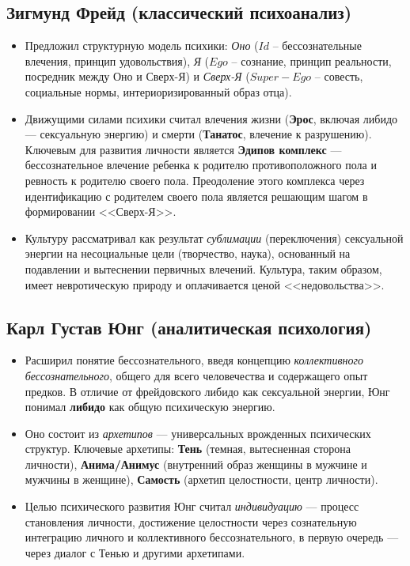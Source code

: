 \documentclass[12pt,a4paper]{article}
\begin{document}
	\subsection{Зигмунд Фрейд (классический психоанализ)}
	\begin{itemize}
		\item Предложил структурную модель психики: \textit{Оно} ($Id$ -- бессознательные влечения, принцип удовольствия), \textit{Я} ($Ego$ -- сознание, принцип реальности, посредник между Оно и Сверх-Я) и \textit{Сверх-Я} ($Super-Ego$ -- совесть, социальные нормы, интериоризированный образ отца).
		\item Движущими силами психики считал влечения жизни (\textbf{Эрос}, включая либидо — сексуальную энергию) и смерти (\textbf{Танатос}, влечение к разрушению). Ключевым для развития личности является \textbf{Эдипов комплекс} — бессознательное влечение ребенка к родителю противоположного пола и ревность к родителю своего пола. Преодоление этого комплекса через идентификацию с родителем своего пола является решающим шагом в формировании <<Сверх-Я>>.
		\item Культуру рассматривал как результат \textit{сублимации} (переключения) сексуальной энергии на несоциальные цели (творчество, наука), основанный на подавлении и вытеснении первичных влечений. Культура, таким образом, имеет невротическую природу и оплачивается ценой <<недовольства>>.
	\end{itemize}
	
	\subsection{Карл Густав Юнг (аналитическая психология)}
	\begin{itemize}
		\item Расширил понятие бессознательного, введя концепцию \textit{коллективного бессознательного}, общего для всего человечества и содержащего опыт предков. В отличие от фрейдовского либидо как сексуальной энергии, Юнг понимал \textbf{либидо} как общую психическую энергию.
		\item Оно состоит из \textit{архетипов} — универсальных врожденных психических структур. Ключевые архетипы: \textbf{Тень} (темная, вытесненная сторона личности), \textbf{Анима/Анимус} (внутренний образ женщины в мужчине и мужчины в женщине), \textbf{Самость} (архетип целостности, центр личности).
		\item Целью психического развития Юнг считал \textit{индивидуацию} — процесс становления личности, достижение целостности через сознательную интеграцию личного и коллективного бессознательного, в первую очередь — через диалог с Тенью и другими архетипами.
	\end{itemize}
	
\end{document}
